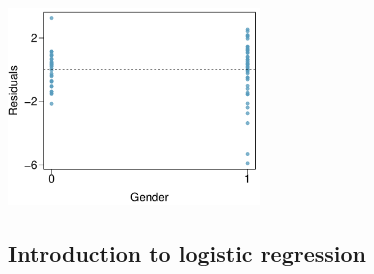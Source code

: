 {\begin{center}
\includegraphics[width=0.5\textwidth]{ch_regr_mult_and_log/figures/eoce/gpa_iq_conds/gpa_iq_conds_res_gender.pdf} 
\end{center}
}{}

\subsection{Introduction to logistic regression}


